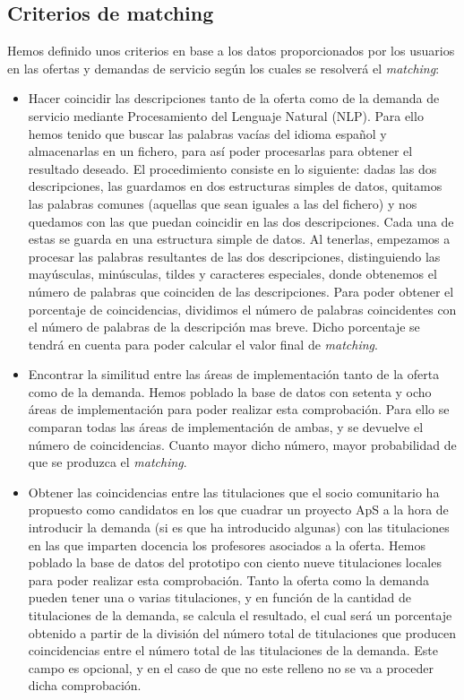 \documentclass[11pt]{book}
\begin{document}
	\subsection{Criterios de matching }
	Hemos definido unos criterios en base a los datos proporcionados por los usuarios en las ofertas y demandas de servicio según los cuales se resolverá el \emph{matching}:
	\begin{itemize} 	
		\item Hacer coincidir las descripciones tanto de la oferta como de la demanda de servicio mediante Procesamiento del Lenguaje Natural (NLP).
		Para ello hemos tenido que buscar las palabras vacías del idioma español y almacenarlas en un fichero, para así poder  procesarlas para obtener el resultado deseado. El procedimiento consiste en lo siguiente: dadas las dos descripciones, las guardamos en dos estructuras simples de datos, quitamos las palabras comunes (aquellas que sean iguales a las del fichero) y nos quedamos con las que puedan coincidir en las dos descripciones. Cada una de estas se guarda en una estructura simple de datos. Al tenerlas, empezamos a procesar las palabras resultantes de las dos descripciones, distinguiendo las mayúsculas, minúsculas, tildes y caracteres especiales, donde obtenemos el número de palabras que coinciden de las descripciones. Para poder obtener el porcentaje de coincidencias, dividimos el número de palabras coincidentes con el número de palabras de la descripción mas breve. Dicho porcentaje se tendrá en cuenta para poder calcular el valor final de \emph{matching}.
		\item Encontrar la similitud entre las áreas de implementación tanto de la oferta como de la demanda. Hemos poblado la base de datos con setenta y ocho áreas de implementación para poder realizar esta comprobación. Para ello se comparan todas las áreas de implementación de ambas, y se devuelve el número de coincidencias. Cuanto mayor dicho número, mayor probabilidad de que se produzca el \emph{matching}.
		\item Obtener las coincidencias entre las titulaciones que el socio
		comunitario ha propuesto como candidatos en los que cuadrar un proyecto
		ApS a la hora de introducir la demanda (si es que ha introducido algunas) con las titulaciones en las que imparten docencia los profesores asociados a la oferta. 
		Hemos poblado la base de datos del prototipo con ciento nueve titulaciones locales para poder realizar esta comprobación. Tanto la oferta como la demanda pueden tener una o varias titulaciones, y en función de la cantidad de titulaciones de la demanda, se calcula el resultado, el cual será un porcentaje obtenido a partir de la división del número total de titulaciones que producen coincidencias entre el  número total de las titulaciones de la demanda. Este campo es opcional, y en el caso de que no este relleno no se va a proceder dicha comprobación.

\end{itemize}
\end{document}
